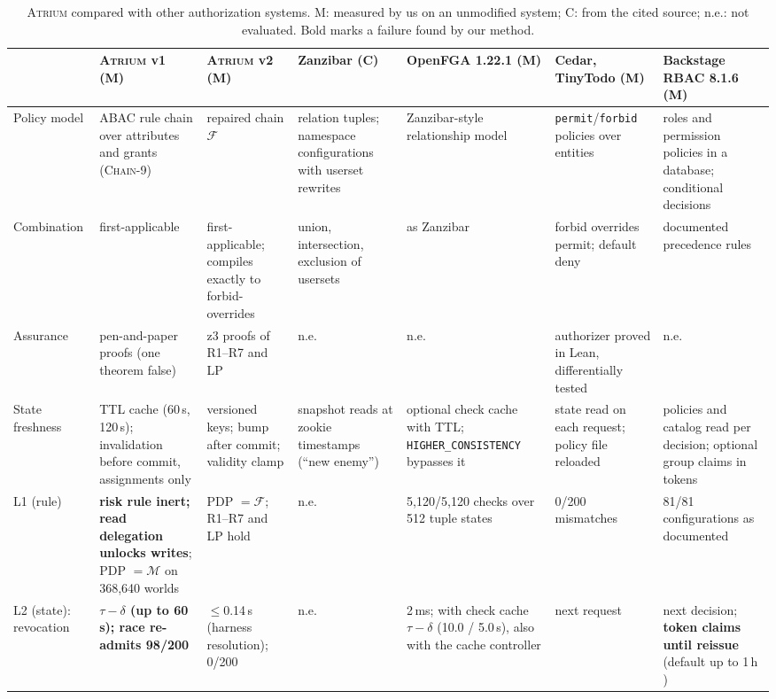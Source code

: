\documentclass[sigconf,review,anonymous]{acmart}
\newcommand{\sysname}{\textsc{Atrium}\xspace}
\newcommand{\sysname}{\textsc{OpenZTAC}\xspace}
\newcommand{\chain}{\textsc{Chain-9}\xspace}
\begin{document}
\begin{table}[t]
\caption{\sysname compared with other authorization systems. M: measured by us on an unmodified system; C: from
the cited source; n.e.: not evaluated. Bold marks a failure found by our method.}
\label{tab:compare}
\footnotesize
\begin{tabularx}{\textwidth}{@{}l@{\;\;}X@{\;\;}X@{\;\;}X@{\;\;}X@{\;\;}X@{\;\;}X@{}}
\toprule
 & \sysname v1 (M) & \sysname v2 (M) & Zanzibar \cite{pang2019zanzibar} (C) & OpenFGA 1.22.1 (M) & Cedar, TinyTodo (M) & Backstage RBAC 8.1.6 (M) \\
\midrule
Policy model & ABAC rule chain over attributes and grants (\chain) & repaired chain $\mathcal{F}$ & relation tuples; namespace configurations with userset rewrites & Zanzibar-style relationship model & \texttt{permit}/\texttt{forbid} policies over entities \cite{cutler2024cedar} & roles and permission policies in a database; conditional decisions \cite{backstagerbac} \\
Combination & first-applicable & first-applicable; compiles exactly to forbid-overrides & union, intersection, exclusion of usersets & as Zanzibar & forbid overrides permit; default deny & documented precedence rules \\
Assurance & pen-and-paper proofs (one theorem false) & z3 proofs of R1--R7 and LP & n.e. & n.e. & authorizer proved in Lean, differentially tested \cite{cutler2024cedar,disselkoen2024vgd} & n.e. \\
State freshness & TTL cache (60\,s, 120\,s); invalidation before commit, assignments only & versioned keys; bump after commit; validity clamp & snapshot reads at zookie timestamps (``new enemy'') & optional check cache with TTL; \texttt{HIGHER\_CONSISTENCY} bypasses it & state read on each request; policy file reloaded & policies and catalog read per decision; optional group claims in tokens \\
L1 (rule) & \textbf{risk rule inert; read delegation unlocks writes}; PDP $=\mathcal{M}$ on 368{,}640 worlds & PDP $=\mathcal{F}$; R1--R7 and LP hold & n.e. & 5{,}120/5{,}120 checks over 512 tuple states & 0/200 mismatches & 81/81 configurations as documented \\
L2 (state): revocation & \textbf{$\tau-\delta$ (up to 60\,s); race re-admits 98/200} & $\le$0.14\,s (harness resolution); 0/200 & n.e. & 2\,ms; with check cache \textbf{$\tau-\delta$} (10.0 / 5.0\,s), also with the cache controller & next request & next decision; \textbf{token claims until reissue} (default up to 1\,h \cite{backstageauth}) \\

\end{tabularx}
\end{table}
\end{document}
